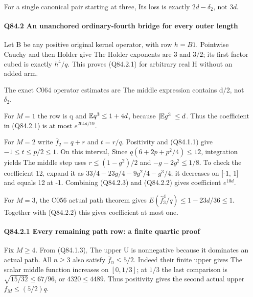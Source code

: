 For a single canonical pair starting at three,
Its loss is exactly \(2d-\delta_2\), not \(3d\).

\paragraph{Q84.2 An unanchored ordinary-fourth bridge for every outer length}

Let B be any positive original kernel operator, with row \(h=B1\).
Pointwise Cauchy and then Holder give
The Holder exponents are 3 and \(3/2\); its first factor cubed is exactly
\(h^4/q\). This proves (Q84.2.1) for arbitrary real H without an added arm.

The exact C064 operator estimates are
The middle expression contains d/2, not \(\delta_2\).

For \(M=1\) the row is q and \(\mathbb E q^3\le1+4d\), because \(|\mathbb E g^3|\le d\).
Thus the coefficient in (Q84.2.1) is at most \(e^{204d/19}\).

For \(M=2\) write \(\bar f_2=q+r\) and \(t=r/q\). Positivity and (Q84.1.1) give
\(-1\le t\le p/2\le1\). On this interval,
Since \(q(6+2p+p^2/4)\le12\), integration yields
The middle step uses \(r\le(1-g^2)/2\) and
\(-g-2g^2\le1/8\). To check the coefficient 12, expand it as
\(33/4-23g/4-9g^2/4-g^3/4\); it decreases on [-1, 1] and equals
12 at -1. Combining (Q84.2.3) and (Q84.2.2) gives coefficient \(e^{10d}\).

For \(M=3\), the C056 actual path theorem gives
\(E(\bar f_3^4/q)\le1-23d/36\le1\). Together with (Q84.2.2) this gives
coefficient at most one.

\paragraph{Q84.2.1 Every remaining path row: a finite quartic proof}

Fix \(M\ge 4\). From (Q84.1.3),
The upper U is nonnegative because it dominates an actual path.
All \(n\ge 3\) also satisfy \(\bar f_n\le5/2\). Indeed their finite upper gives
The scalar middle function increases on \([0,\allowbreak  1/3]\); at \(1/3\) the last
comparison is \(\sqrt{15/32}\le67/96\), or \(4320\le4489\).
Thus positivity gives the second actual upper \(\bar f_M\le(5/2)q\).

